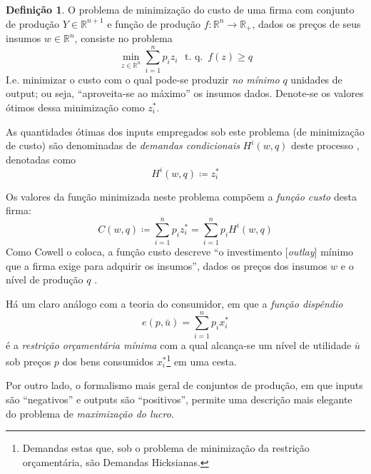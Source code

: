 \documentclass[12pt]{article}
\numberwithin{equation}{section}
\theoremstyle{plain}
\theoremstyle{definition}
\newtheorem{definition}[theorem]{Definição}
\theoremstyle{remark}
\begin{document}
\begin{definition}
O problema de minimização do custo de uma firma com conjunto de produção
\(Y \in \mathbb{R}^{n+1}\) e função de produção
\(f: \mathbb{R}^{n} \to \mathbb{R}_{+}\), dados os preços de seus
insumos \(w \in \mathbb{R}^{n}\), consiste no problema
\[
\min\limits_{z \in \mathbb{R}^{n}} \sum \limits_{i=1}^{n} p_{i}z_{i \,\,\,} \text{  t. q. } \, f(z) \geq q
\]
I.e. minimizar o custo com o qual pode-se produzir \textit{no mínimo}
\(q\) unidades de output; ou seja, ``aproveita-se ao máximo'' os insumos
dados. Denote-se os valores ótimos dessa minimização como \(z_{i}^*\).

As quantidades ótimas dos inputs empregados sob este problema (de
minimização de custo) são denominadas de \textit{demandas condicionais}
\(H^{i}(w,q)\) deste processo \parencite[, p. 23]{Cowell2004}, denotadas
como
\[
H^{i}(w, q) \coloneqq z^{*}_{i}
\]

Os valores da função minimizada neste problema compõem a \textit{função
custo} desta firma:
\[
C(w,q) \coloneqq \sum \limits_{i=1}^{n} p_{i} z^{*}_{i} = \sum \limits_{i=1}^{n}p_{i} H^{i}(w, q)
\]
Como Cowell o coloca, a função custo descreve ``o investimento
{[}\textit{outlay}{]} mínimo que a firma exige para adquirir os
insumos'', dados os preços dos insumos \(w\) e o nível de produção \(q\)
\parencite[, p. 23]{Cowell2004}.

Há um claro análogo com a teoria do consumidor, em que a \textit{função
dispêndio}
\[
e(p, \bar{u}) = \sum \limits_{i=1}^{n} p_{i} x_{i}^{*}
\]
é a \textit{restrição orçamentária mínima} com a qual alcança-se um
nível de utilidade \(\bar{u}\) sob preços \(p\) dos bens consumidos
\(x_{i}^{*}\)\footnote{Demandas estas que, sob o problema de minimização
  da restrição orçamentária, são Demandas Hicksianas.} em uma cesta.
\end{definition}

Por outro lado, o formalismo mais geral de conjuntos de produção, em que inputs são ``negativos'' e outputs são ``positivos'', permite uma descrição mais elegante do problema de \textit{maximização do lucro}.
\end{document}
